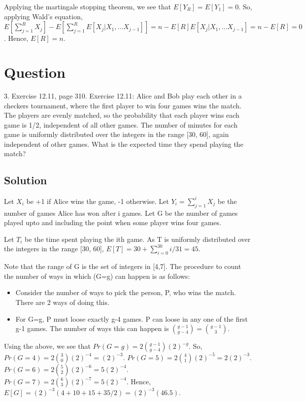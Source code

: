 \documentclass[10pt]{amsart}
\theoremstyle{remark}
\begin{document}
Applying the martingale stopping theorem, we see that $E[Y_{R}] = E[Y_{1}] = 0$. So, applying Wald's equation, $E[\sum_{j=1}^{R}X_{j}] - E[\sum_{j=1}^{R}E[X_{j}|X_{1},\dots X_{j-1}]] = n - E[R]E[X_{j}|X_{1},\dots X_{j-1}] = n - E[R] = 0$. Hence, $E[R] = n$.

\section{Question}
3. Exercise 12.11, page 310. Exercise 12.11: Alice and Bob play each other in a checkers tournament, where the first player to win four games wins the match. The players are evenly matched, so the probability that each player wins each game is 1/2, independent of all other games. The number of minutes for each game is uniformly distributed over the integers in the range [30, 60], again independent of other games. What is the expected time they spend playing the match?

\subsection{Solution}
Let $X_{i}$ be +1 if Alice wins the game, -1 otherwise. Let $Y_{i} = \sum_{j=1}^{i} X_{j}$ be the number of games Alice has won after i games. Let G be the number of games played upto and including the point when some player wins four games.

Let $T_{i}$ be the time spent playing the ith game. As T is uniformly distributed over the integers in the range [30, 60], $E[T] = 30 + \sum_{i=0}^{30}i/31 = 45$.

Note that the range of G is the set of integers in [4,7]. The procedure to count the number of ways in which (G=g) can happen is as follows:
\begin{itemize}
\item Consider the number of ways to pick the person, P, who wins the match. There are 2 ways of doing this.
\item For G=g, P must loose exactly g-4 games. P can loose in any one of the first g-1 games. The number of ways this can happen is $\binom{g-1}{g-4} = \binom{g-1}{3}$.
\end{itemize}

Using the above, we see that $Pr(G=g) = 2\binom{g-1}{g-4}(2)^{-g}$. So, $Pr(G=4) = 2\binom{3}{0}(2)^{-4} = (2)^{-3}$. $Pr(G=5) = 2\binom{4}{1}(2)^{-5} = 2(2)^{-3}$. $Pr(G=6) = 2\binom{5}{2}(2)^{-6} = 5(2)^{-4}$. $Pr(G=7) = 2\binom{6}{3}(2)^{-7} = 5(2)^{-4}$. Hence, $E[G] = (2)^{-3}(4 + 10 + 15 +35/2) = (2)^{-3}(46.5)$.
\end{document}
